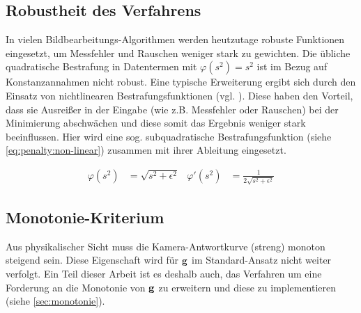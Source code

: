 \subsection{Robustheit des Verfahrens}
\label{algo:schwachstellen:robustheit}
In vielen Bildbearbeitungs-Algorithmen werden heutzutage robuste Funktionen eingesetzt, um Messfehler und Rauschen weniger stark zu gewichten. Die übliche quadratische Bestrafung in Datentermen mit $\varphi(s^2) = s^2$ ist im Bezug auf Konstanzannahmen nicht robust. Eine typische Erweiterung ergibt sich durch den Einsatz von nichtlinearen Bestrafungsfunktionen (vgl. \cite[S. 9f, S. 87f]{bruhn06}). Diese haben den Vorteil, dass sie Ausreißer in der Eingabe (wie z.B. Messfehler oder Rauschen) bei der Minimierung abschwächen und diese somit das Ergebnis weniger stark beeinflussen. Hier wird eine sog. subquadratische Bestrafungsfunktion (siehe \autoref{eq:penalty:non-linear}) zusammen mit ihrer Ableitung eingesetzt.

\begin{align}
\label{eq:penalty:non-linear}
\varphi(s^2) &= \sqrt{s^2 + \epsilon^2} & 
\varphi'(s^2) &= \frac{1}{2\sqrt{s^2 + \epsilon^2}}
\end{align}

\subsection{Monotonie-Kriterium}
\label{algo:schwachstellen:monotonie}
Aus physikalischer Sicht muss die Kamera-Antwortkurve (streng) monoton steigend sein. Diese Eigenschaft wird für $\mathbf g$ im Standard-Ansatz nicht weiter verfolgt. Ein Teil dieser Arbeit ist es deshalb auch, das Verfahren um eine Forderung an die Monotonie von $\mathbf g$ zu erweitern und diese zu implementieren (siehe \autoref{sec:monotonie}).
